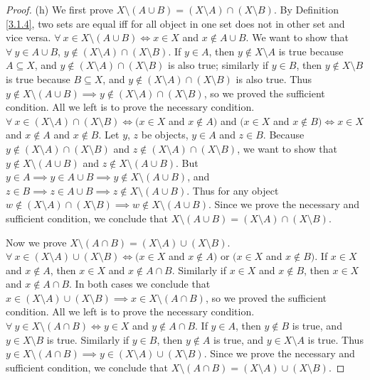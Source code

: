 \begin{proof}{(h)}
We first prove \(X \setminus (A \cup B) = (X \setminus A) \cap (X \setminus B)\).
By Definition \ref{3.1.4}, two sets are equal iff for all object in one set does not in other set and vice versa.
\(\forall\ x \in X \setminus (A \cup B) \iff x \in X\) and \(x \notin A \cup B\).
We want to show that \(\forall\ y \in A \cup B\), \(y \notin (X \setminus A) \cap (X \setminus B)\).
If \(y \in A\), then \(y \notin X \setminus A\) is true because \(A \subseteq X\), and \(y \notin (X \setminus A) \cap (X \setminus B)\) is also true;
similarly if \(y \in B\), then \(y \notin X \setminus B\) is true because \(B \subseteq X\), and \(y \notin (X \setminus A) \cap (X \setminus B)\) is also true.
Thus \(y \notin X \setminus (A \cup B) \implies y \notin (X \setminus A) \cap (X \setminus B)\), so we proved the sufficient condition.
All we left is to prove the necessary condition.
\(\forall\ x \in (X \setminus A) \cap (X \setminus B) \iff (x \in X\) and \(x \notin A)\) and \((x \in X\) and \(x \notin B) \iff x \in X\) and \(x \notin A\) and \(x \notin B\).
Let \(y\), \(z\) be objects, \(y \in A\) and \(z \in B\).
Because \(y \notin (X \setminus A) \cap (X \setminus B)\) and \(z \notin (X \setminus A) \cap (X \setminus B)\), we want to show that \(y \notin X \setminus (A \cup B)\) and \(z \notin X \setminus (A \cup B)\).
But \(y \in A \implies y \in A \cup B \implies y \notin X \setminus (A \cup B)\), and \(z \in B \implies z \in A \cup B \implies z \notin X \setminus (A \cup B)\).
Thus for any object \(w \notin (X \setminus A) \cap (X \setminus B) \implies w \notin X \setminus (A \cup B)\).
Since we prove the necessary and sufficient condition, we conclude that \(X \setminus (A \cup B) = (X \setminus A) \cap (X \setminus B)\).

Now we prove \(X \setminus (A \cap B) = (X \setminus A) \cup (X \setminus B)\).
\(\forall\ x \in (X \setminus A) \cup (X \setminus B) \iff (x \in X\) and \(x \notin A)\) or \((x \in X\) and \(x \notin B)\).
If \(x \in X\) and \(x \notin A\), then \(x \in X\) and \(x \notin A \cap B\).
Similarly if \(x \in X\) and \(x \notin B\), then \(x \in X\) and \(x \notin A \cap B\).
In both cases we conclude that \(x \in (X \setminus A) \cup (X \setminus B) \implies x \in X \setminus (A \cap B)\), so we proved the sufficient condition.
All we left is to prove the necessary condition.
\(\forall\ y \in X \setminus (A \cap B) \iff y \in X\) and \(y \notin A \cap B\).
If \(y \in A\), then \(y \notin B\) is true, and \(y \in X \setminus B\) is true.
Similarly if \(y \in B\), then \(y \notin A\) is true, and \(y \in X \setminus A\) is true.
Thus \(y \in X \setminus (A \cap B) \implies y \in (X \setminus A) \cup (X \setminus B)\).
Since we prove the necessary and sufficient condition, we conclude that \(X \setminus (A \cap B) = (X \setminus A) \cup (X \setminus B)\).
\end{proof}

